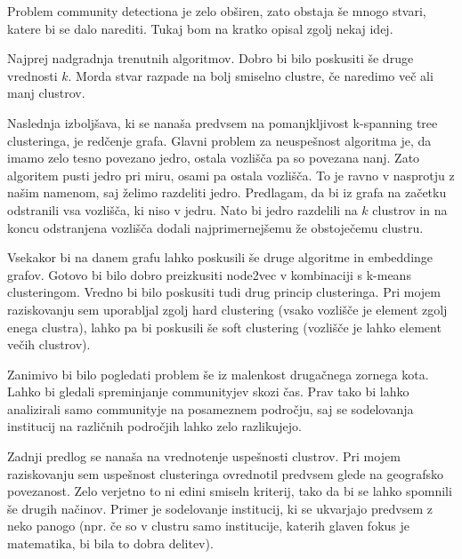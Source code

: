 \documentclass[a4paper,12pt]{article}
\begin{document}
	Problem community detectiona je zelo obširen, zato obstaja še mnogo stvari, katere bi se dalo narediti. Tukaj bom na kratko opisal zgolj nekaj idej.
	
	Najprej nadgradnja trenutnih algoritmov. Dobro bi bilo poskusiti še druge vrednosti $k$. Morda stvar razpade na bolj smiselno clustre, če naredimo več ali manj clustrov.
	
	Naslednja izboljšava, ki se nanaša predvsem na pomanjkljivost k-spanning tree clusteringa, je redčenje grafa. Glavni problem za neuspešnost algoritma je, da imamo zelo tesno povezano jedro, ostala vozlišča pa so povezana nanj. Zato algoritem pusti jedro pri miru, osami pa ostala vozlišča. To je ravno v nasprotju z našim namenom, saj želimo razdeliti jedro. Predlagam, da bi iz grafa na začetku odstranili vsa vozlišča, ki niso v jedru. Nato bi jedro razdelili na $k$ clustrov in na koncu odstranjena vozlišča dodali najprimernejšemu že obstoječemu clustru. 
	
	Vsekakor bi na danem grafu lahko poskusili še druge algoritme in embeddinge grafov. Gotovo bi bilo dobro preizkusiti node2vec v kombinaciji s k-means clusteringom. Vredno bi bilo poskusiti tudi drug princip clusteringa. Pri mojem raziskovanju sem uporabljal zgolj hard clustering (vsako vozlišče je element zgolj enega clustra), lahko pa bi poskusili še soft clustering (vozlišče je lahko element večih clustrov).
	
	Zanimivo bi bilo pogledati problem še iz malenkost drugačnega zornega kota. Lahko bi gledali spreminjanje communityjev skozi čas. Prav tako bi lahko analizirali samo communityje na posameznem področju, saj se sodelovanja institucij na različnih področjih lahko zelo razlikujejo. 
		
	Zadnji predlog se nanaša na vrednotenje uspešnosti clustrov. Pri mojem raziskovanju sem uspešnost clusteringa ovrednotil predvsem glede na geografsko povezanost. Zelo verjetno to ni edini smiseln kriterij, tako da bi se lahko spomnili še drugih načinov. Primer je sodelovanje institucij, ki se ukvarjajo predvsem z neko panogo (npr. če so v clustru samo institucije, katerih glaven fokus je matematika, bi bila to dobra delitev).
		
\end{document}
